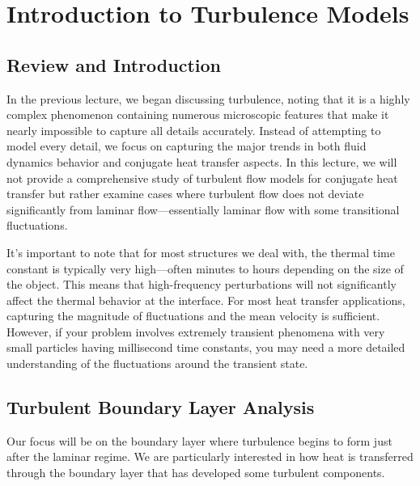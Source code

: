 \section*{Introduction to Turbulence Models}
\subsection*{Review and Introduction}
In the previous lecture, we began discussing turbulence, noting that it is a highly complex phenomenon containing numerous microscopic features that make it nearly impossible to capture all details accurately. Instead of attempting to model every detail, we focus on capturing the major trends in both fluid dynamics behavior and conjugate heat transfer aspects. In this lecture, we will not provide a comprehensive study of turbulent flow models for conjugate heat transfer but rather examine cases where turbulent flow does not deviate significantly from laminar flow—essentially laminar flow with some transitional fluctuations.

It's important to note that for most structures we deal with, the thermal time constant is typically very high—often minutes to hours depending on the size of the object. This means that high-frequency perturbations will not significantly affect the thermal behavior at the interface. For most heat transfer applications, capturing the magnitude of fluctuations and the mean velocity is sufficient. However, if your problem involves extremely transient phenomena with very small particles having millisecond time constants, you may need a more detailed understanding of the fluctuations around the transient state.
\subsection*{Turbulent Boundary Layer Analysis}
Our focus will be on the boundary layer where turbulence begins to form just after the laminar regime. We are particularly interested in how heat is transferred through the boundary layer that has developed some turbulent components. 

